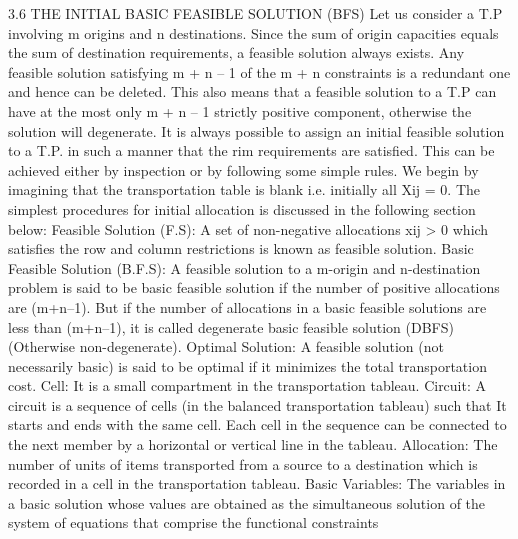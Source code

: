 \documentclass{article}
\begin{document}
3.6 THE INITIAL BASIC FEASIBLE SOLUTION (BFS) 
Let us consider a T.P involving m origins and n destinations. Since the sum of origin capacities equals the sum of destination requirements, a feasible solution always exists. Any feasible solution satisfying m + n – 1 of the m + n constraints is a redundant one and hence can be deleted. This also means that a feasible solution to a T.P can have at the most only m + n – 1 strictly positive component, otherwise the solution will degenerate. It is always possible to assign an initial feasible solution to a T.P. in such a manner that the rim requirements are satisfied. This can be achieved either by inspection or by following some simple rules. We begin by imagining that the transportation table is blank i.e. initially all Xij = 0. The simplest procedures for initial allocation is discussed in the following section below:
Feasible Solution (F.S):  A set of non-negative allocations xij > 0 which satisfies the row and column restrictions is known as feasible solution. 
Basic Feasible Solution (B.F.S): A feasible solution to a m-origin and n-destination problem is said to be basic feasible solution if the number of positive allocations are (m+n–1). But if the number of allocations in a basic feasible solutions are less than (m+n–1), it is called degenerate basic feasible solution (DBFS) (Otherwise non-degenerate). 
Optimal Solution: A feasible solution (not necessarily basic) is said to be optimal if it minimizes the total transportation cost. 
Cell: It is a small compartment in the transportation tableau. 
Circuit: A circuit is a sequence of cells (in the balanced transportation tableau) such that 
It starts and ends with the same cell. 
Each cell in the sequence can be connected to the next member by a horizontal or vertical line in the tableau. 
Allocation: The number of units of items transported from a source to a destination which is recorded in a cell in the transportation tableau. 
Basic Variables: The variables in a basic solution whose values are obtained as the simultaneous solution of the system of equations that comprise the functional constraints
\end{document}
